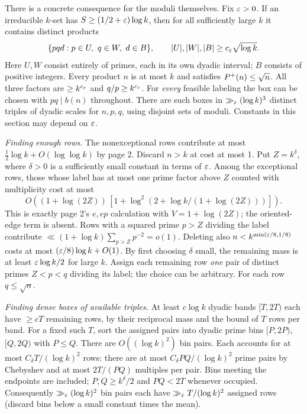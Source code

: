 \newpage
{}
There is a concrete consequence for the moduli themselves. Fix $\varepsilon>0$. If an irreducible $k$-set has $S\ge(1/2+\varepsilon)\log k$, then for all sufficiently large $k$ it contains distinct products
\[
 \{pqd:p\in U,\ q\in W,\ d\in B\},\qquad
 |U|,|W|,|B|\ge c_\varepsilon\sqrt{\log k}.
\]
Here $U,W$ consist entirely of primes, each in its own dyadic interval; $B$ consists of positive integers. Every product $n$ is at most $k$ and satisfies $P^+(n)\le\sqrt n$. All three factors are $\ge k^{c_\varepsilon}$ and $q/p\ge k^{c_\varepsilon}$. For \emph{every} feasible labeling the box can be chosen with $pq\mid b(n)$ throughout. There are such boxes in $\gg_\varepsilon(\log k)^3$ distinct triples of dyadic scales for $n,p,q$, using disjoint sets of moduli. Constants in this section may depend on $\varepsilon$.

\emph{Finding enough rows.} The nonexceptional rows contribute at most $\frac12\log k+O(\log\log k)$ by page 2. Discard $n>k$ at cost at most 1. Put $Z=k^\delta$, where $\delta>0$ is a sufficiently small constant in terms of $\varepsilon$. Among the exceptional rows, those whose label has at most one prime factor above $Z$ counted with multiplicity cost at most
\[
 O\!\left((1+\log(2Z))\,[1+\log^2(2+\log k/(1+\log(2Z)))]\right).
\]
This is exactly page 2's $e,ep$ calculation with $V=1+\log(2Z)$; the oriented-edge term is absent. Rows with a squared prime $p>Z$ dividing the label contribute $\ll(1+\log k)\sum_{p>Z}p^{-2}=o(1)$. Deleting also $n<k^{\min(\varepsilon/8,1/8)}$ costs at most $(\varepsilon/8)\log k+O(1)$. By first choosing $\delta$ small, the remaining mass is at least $\varepsilon\log k/2$ for large $k$. Assign each remaining row \emph{one} pair of distinct primes $Z<p<q$ dividing its label; the choice can be arbitrary. For each row $q\le\sqrt n$.

\emph{Finding dense boxes of available triples.} At least $c\log k$ dyadic bands $[T,2T)$ each have $\ge cT$ remaining rows, by their reciprocal mass and the bound of $T$ rows per band. For a fixed such $T$, sort the assigned pairs into dyadic prime bins $[P,2P)$, $[Q,2Q)$ with $P\le Q$. There are $O((\log k)^2)$ bin pairs. Each accounts for at most $C_\delta T/(\log k)^2$ rows: there are at most $C_\delta P Q/(\log k)^2$ prime pairs by Chebyshev and at most $2T/(P Q)$ multiples per pair. Bins meeting the endpoints are included; $P,Q\ge k^\delta/2$ and $P Q<2T$ whenever occupied. Consequently $\gg_\varepsilon(\log k)^2$ bin pairs each have $\gg_\varepsilon T/(\log k)^2$ assigned rows (discard bins below a small constant times the mean).

